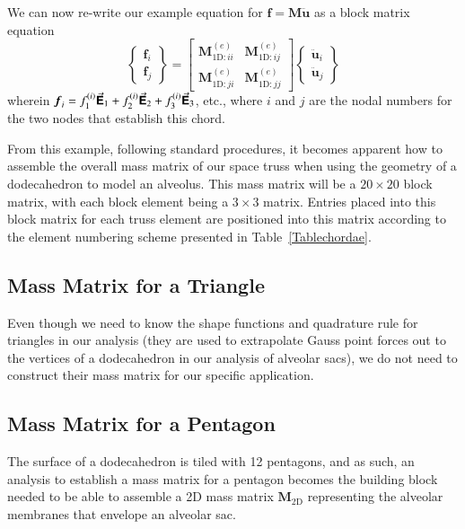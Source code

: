 We can now re-write our example equation for $\boldsymbol{f} = \mathbf{M} \ddot{\boldsymbol{u}}$ as a block matrix equation
\begin{displaymath}
\left\{ \begin{matrix} 
\boldsymbol{f}_i \\ \boldsymbol{f}_j
\end{matrix} \right\} = 
\begin{bmatrix}
\mathbf{M}^{(e)}_{\mathrm{1D}:ii} & \mathbf{M}^{(e)}_{\mathrm{1D}:ij} \\
\mathbf{M}^{(e)}_{\mathrm{1D}:ji} & \mathbf{M}^{(e)}_{\mathrm{1D}:jj}
\end{bmatrix} \left\{ \begin{matrix} 
\ddot{\boldsymbol{u}}_i \\ \ddot{\boldsymbol{u}}_j
\end{matrix} \right\}
\end{displaymath} 
wherein $\boldsymbol{f}_i = f^{(i)}_1 \vec{\boldsymbol{\mathsf{E}}}_1 + f^{(i)}_2 \vec{\boldsymbol{\mathsf{E}}}_2 + f^{(i)}_3 \vec{\boldsymbol{\mathsf{E}}}_3$, etc., where $i$ and $j$ are the nodal numbers for the two nodes that establish this chord.

From this example, following standard procedures, \cite{ClaytonChung18} it becomes apparent how to assemble the overall mass matrix of our space truss when using the geometry of a dodecahedron to model an alveolus.  This mass matrix will be a $20 \! \times \! 20$ block matrix, with each block element being a $3 \! \times \! 3$ matrix.  Entries placed into this block matrix for each truss element are positioned into this matrix according to the element numbering scheme presented in Table~\ref{Tablechordae}.

\subsection{Mass Matrix for a Triangle}

Even though we need to know the shape functions and quadrature rule for triangles in our analysis (they are used to extrapolate Gauss point forces out to the vertices of a dodecahedron in our analysis of alveolar sacs), we do not need to construct their mass matrix for our specific application.

\subsection{Mass Matrix for a Pentagon}

The surface of a dodecahedron is tiled with 12 pentagons, and as such, an analysis to establish a mass matrix for a pentagon becomes the building block needed to be able to assemble a 2D mass matrix $\mathbf{M}_{\mathrm{2D}}$ representing the alveolar membranes that envelope an alveolar sac.

